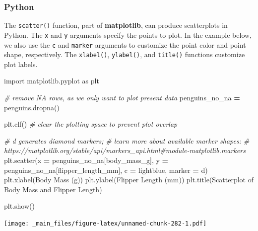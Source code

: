 \documentclass[
]{book}
\newenvironment{Shaded}{\begin{snugshade}}{\end{snugshade}}
\newcommand{\CommentTok}[1]{\textcolor[rgb]{0.56,0.35,0.01}{\textit{#1}}}
\newcommand{\ImportTok}[1]{#1}
\newcommand{\NormalTok}[1]{#1}
\newcommand{\OperatorTok}[1]{\textcolor[rgb]{0.81,0.36,0.00}{\textbf{#1}}}
\newcommand{\StringTok}[1]{\textcolor[rgb]{0.31,0.60,0.02}{#1}}
\begin{document}
\hypertarget{python-43}{%
\subsubsection*{Python}\label{python-43}}

The \texttt{scatter()} function, part of \textbf{matplotlib}, can produce scatterplots in Python. The \texttt{x} and \texttt{y} arguments specify the points to plot. In the example below, we also use the \texttt{c} and \texttt{marker} arguments to customize the point color and point shape, respectively. The \texttt{xlabel()}, \texttt{ylabel()}, and \texttt{title()} functions customize plot labels.

\begin{Shaded}
\begin{Highlighting}[]
\ImportTok{import}\NormalTok{ matplotlib.pyplot }\ImportTok{as}\NormalTok{ plt}

\CommentTok{\# remove NA rows, as we only want to plot present data}
\NormalTok{penguins\_no\_na }\OperatorTok{=}\NormalTok{ penguins.dropna() }

\NormalTok{plt.clf() }\CommentTok{\# clear the plotting space to prevent plot overlap}

\CommentTok{\# \textquotesingle{}d\textquotesingle{} generates diamond markers; }
\CommentTok{\# learn more about available marker shapes: }
\CommentTok{\# https://matplotlib.org/stable/api/markers\_api.html\#module{-}matplotlib.markers}
\NormalTok{plt.scatter(x }\OperatorTok{=}\NormalTok{ penguins\_no\_na[}\StringTok{\textquotesingle{}body\_mass\_g\textquotesingle{}}\NormalTok{], }
\NormalTok{            y }\OperatorTok{=}\NormalTok{ penguins\_no\_na[}\StringTok{\textquotesingle{}flipper\_length\_mm\textquotesingle{}}\NormalTok{], }
\NormalTok{            c }\OperatorTok{=} \StringTok{\textquotesingle{}lightblue\textquotesingle{}}\NormalTok{, marker }\OperatorTok{=} \StringTok{\textquotesingle{}d\textquotesingle{}}\NormalTok{) }
\NormalTok{plt.xlabel(}\StringTok{\textquotesingle{}Body Mass (g)\textquotesingle{}}\NormalTok{)}
\NormalTok{plt.ylabel(}\StringTok{\textquotesingle{}Flipper Length (mm)\textquotesingle{}}\NormalTok{)}
\NormalTok{plt.title(}\StringTok{\textquotesingle{}Scatterplot of Body Mass and Flipper Length\textquotesingle{}}\NormalTok{)}

\NormalTok{plt.show()}
\end{Highlighting}
\end{Shaded}

\texttt{[image: \_main\_files/figure-latex/unnamed-chunk-282-1.pdf]}
\end{document}
